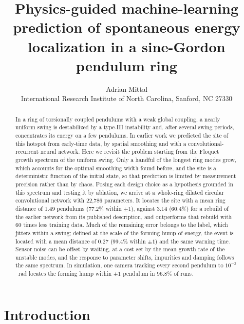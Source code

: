 \documentclass[11pt]{article}
\title{Physics-guided machine-learning prediction of spontaneous energy localization in a sine-Gordon pendulum ring}
\author{Adrian Mittal\\[2pt]
{\small International Research Institute of North Carolina, Sanford, NC 27330}}
\date{}
\begin{document}
\maketitle

\begin{abstract}
In a ring of torsionally coupled pendulums with a weak global coupling, a nearly uniform swing is destabilized by a type-III instability and, after several swing periods, concentrates its energy on a few pendulums. In earlier work we predicted the site of this hotspot from early-time data, by spatial smoothing and with a convolutional-recurrent neural network. Here we revisit the problem starting from the Floquet growth spectrum of the uniform swing. Only a handful of the longest ring modes grow, which accounts for the optimal smoothing width found before, and the site is a deterministic function of the initial state, so that prediction is limited by measurement precision rather than by chaos. Posing each design choice as a hypothesis grounded in this spectrum and testing it by ablation, we arrive at a whole-ring dilated circular convolutional network with 22,786 parameters. It locates the site with a mean ring distance of 1.49 pendulums (77.2\% within $\pm1$), against 3.14 (60.4\%) for a rebuild of the earlier network from its published description, and outperforms that rebuild with 60 times less training data. Much of the remaining error belongs to the label, which jitters within a swing; defined at the scale of the forming hump of energy, the event is located with a mean distance of 0.27 (99.4\% within $\pm1$) and the same warning time. Sensor noise can be offset by waiting, at a cost set by the mean growth rate of the unstable modes, and the response to parameter shifts, impurities and damping follows the same spectrum. In simulation, one camera tracking every second pendulum to $10^{-3}$~rad locates the forming hump within $\pm1$ pendulum in 96.8\% of runs.
\end{abstract}

\section{Introduction}
\label{sec:intro}
\end{document}
